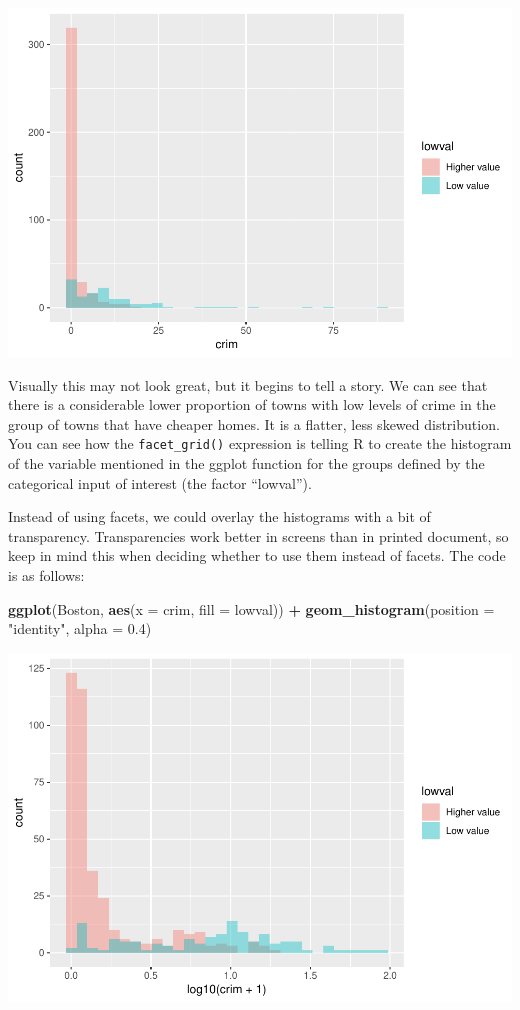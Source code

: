 \documentclass[]{book}
\newenvironment{Shaded}{\begin{snugshade}}{\end{snugshade}}
\newcommand{\DataTypeTok}[1]{\textcolor[rgb]{0.13,0.29,0.53}{#1}}
\newcommand{\FloatTok}[1]{\textcolor[rgb]{0.00,0.00,0.81}{#1}}
\newcommand{\KeywordTok}[1]{\textcolor[rgb]{0.13,0.29,0.53}{\textbf{#1}}}
\newcommand{\NormalTok}[1]{#1}
\newcommand{\OperatorTok}[1]{\textcolor[rgb]{0.81,0.36,0.00}{\textbf{#1}}}
\newcommand{\StringTok}[1]{\textcolor[rgb]{0.31,0.60,0.02}{#1}}
\theoremstyle{definition}
\theoremstyle{definition}
\theoremstyle{definition}
\theoremstyle{remark}
\begin{document}
\includegraphics{03-visualisation_files/figure-latex/unnamed-chunk-21-1.pdf}

Visually this may not look great, but it begins to tell a story. We can
see that there is a considerable lower proportion of towns with low
levels of crime in the group of towns that have cheaper homes. It is a
flatter, less skewed distribution. You can see how the
\texttt{facet\_grid()} expression is telling R to create the histogram
of the variable mentioned in the ggplot function for the groups defined
by the categorical input of interest (the factor ``lowval'').

Instead of using facets, we could overlay the histograms with a bit of
transparency. Transparencies work better in screens than in printed
document, so keep in mind this when deciding whether to use them instead
of facets. The code is as follows:

\begin{Shaded}
\begin{Highlighting}[]
\KeywordTok{ggplot}\NormalTok{(Boston, }\KeywordTok{aes}\NormalTok{(}\DataTypeTok{x =}\NormalTok{ crim, }\DataTypeTok{fill =}\NormalTok{ lowval)) }\OperatorTok{+}\StringTok{ }
\StringTok{  }\KeywordTok{geom_histogram}\NormalTok{(}\DataTypeTok{position =} \StringTok{"identity"}\NormalTok{, }\DataTypeTok{alpha =} \FloatTok{0.4}\NormalTok{)}
\end{Highlighting}
\end{Shaded}

\includegraphics{03-visualisation_files/figure-latex/unnamed-chunk-22-1.pdf}
\end{document}
